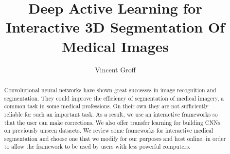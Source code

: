 \documentclass[a4paper]{article}
\title{Deep Active Learning for Interactive 3D Segmentation Of Medical Images}
\author{Vincent Groff}
\begin{document}
\maketitle

\begin{abstract}
Convolutional neural networks have shown great successes in image recognition and segmentation. They could improve the efficiency of segmentation of medical imagery, a common task in some medical professions. On their own they are not sufficiently reliable for such an important task. As a result, we use an interactive frameworks so that the user can make corrections. We also offer transfer learning for building CNNs on previously unseen datasets. We review some frameworks for interactive medical segmentation and choose one that we modify for our purposes and host online, in order to allow the framework to be used by users with less powerful computers. 
\end{abstract}















\end{document}
